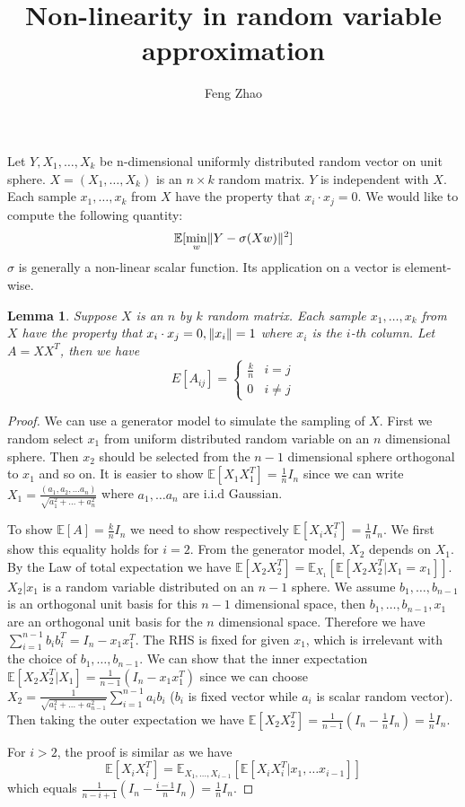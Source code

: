 \documentclass{article}
\title{Non-linearity in random variable approximation}
\author{Feng Zhao}
\DeclarePairedDelimiter\norm{\lVert}{\rVert}
\def\E{\mathbb{E}}
\newtheorem{lemma}{Lemma}
\begin{document}
\maketitle
Let $Y, X_1, \dots, X_k$ be n-dimensional uniformly distributed random vector on unit sphere. $X=(X_1, \dots, X_k)$ is an $n\times k$ random matrix. $Y$ is independent with $X$. Each sample $x_1, \dots, x_k$ from $X$ have the property that $x_i \cdot x_j = 0$. We would like to compute the following quantity:
\begin{equation}\label{eq:Eminw}
\E[\min_w \norm{Y - \sigma (X w ) }^2]
\end{equation}
$\sigma$ is generally a non-linear scalar function. Its application on a vector is element-wise.
\begin{lemma}\label{lem:uniform}
Suppose $X$ is an $n$ by $k$ random matrix. Each sample $x_1, \dots, x_k$ from $X$ have the property that $x_i \cdot x_j = 0, \norm{x_i}=1$ where $x_i$ is the $i$-th column.  Let $A=X X^T$, then we have
\begin{equation}
E[A_{ij}]= \begin{cases}
\frac{k}{n} & i = j\\
0 & i\neq j 
\end{cases}
\end{equation}
\end{lemma}
\begin{proof}
We can use a generator model to simulate the sampling of $X$. First we random select $x_1$ from uniform distributed random variable on an $n$ dimensional sphere. Then $x_2$ should be selected from the $n-1$ dimensional sphere orthogonal to $x_1$ and so on.
It is easier to show $\E[X_1X_1^T] = \frac{1}{n} I_n$ since we can write $X_1 = \frac{(a_1, a_2, \dots a_n) }{\sqrt{a_1^2+\dots + a_n^2}}$ where $a_1, \dots a_n$ are i.i.d Gaussian.

To show $\E[A]=\frac{k}{n}I_n$ we need to show respectively $\E[X_iX_i^T]=\frac{1}{n} I_n$. We first show this equality holds for $i=2$. From the generator model, $X_2$ depends on $X_1$. By the Law of total expectation we have $\E[X_2 X_2^T] = \E_{X_1}[\E[X_2 X_2^T |X_1 = x_1]]$. $X_2 | x_1$ is a random variable distributed on an $n-1$ sphere. We assume $b_1, \dots, b_{n-1}$ is an orthogonal unit basis for this $n-1$ dimensional space,
then $b_1, \dots, b_{n-1}, x_1$ are an orthogonal unit basis for the $n$ dimensional space. Therefore we have
$\sum_{i=1}^{n-1} b_i b_i^T = I_n -  x_1 x_1^T $. The RHS is fixed for given $x_1$, which is irrelevant with the choice of $b_1, \dots, b_{n-1}$. We can show that the inner expectation $\E[X_2 X_2^T |X_1] = \frac{1}{n-1}(I_n - x_1 x_1^T)$ since we can choose $X_2 = \frac{1}{\sqrt{a_1^2 + \dots + a_{n-1}^2}} \sum_{i=1}^{n-1} a_i b_i$ ($b_i$ is fixed vector while $a_i$ is scalar random vector). Then taking the outer expectation we have $\E[X_2 X_2^T] = \frac{1}{n-1} (I_n - \frac{1}{n} I_n) = \frac{1}{n} I_n$.

For $i>2$, the proof is similar as we have $$
\E[X_i X_i^T] = \E_{X_1, \dots, X_{i-1}} [\E[X_i X_i^T | x_1, \dots x_{i-1}]]
$$
 which equals $\frac{1}{n-i+1}(I_n - \frac{i-1}{n} I_n) = \frac{1}{n} I_n$.
\end{proof}
\end{document}
